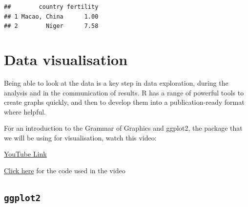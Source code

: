 \documentclass[
]{book}
\newenvironment{Shaded}{\begin{snugshade}}{\end{snugshade}}
\newcommand{\CommentTok}[1]{\textcolor[rgb]{0.56,0.35,0.01}{\textit{#1}}}
\newcommand{\KeywordTok}[1]{\textcolor[rgb]{0.13,0.29,0.53}{\textbf{#1}}}
\newcommand{\NormalTok}[1]{#1}
\newcommand{\OperatorTok}[1]{\textcolor[rgb]{0.81,0.36,0.00}{\textbf{#1}}}
\newcommand{\StringTok}[1]{\textcolor[rgb]{0.31,0.60,0.02}{#1}}
\begin{document}
\begin{Shaded}
\end{Shaded}

\begin{verbatim}
##        country fertility
## 1 Macao, China      1.00
## 2        Niger      7.58
\end{verbatim}

\hypertarget{data-visualisation}{%
\chapter{Data visualisation}\label{data-visualisation}}

Being able to look at the data is a key step in data exploration, during the analysis and in the communication of results. R has a range of powerful tools to create graphs quickly, and then to develop them into a publication-ready format where helpful.

For an introduction to the Grammar of Graphics and ggplot2, the package that we will be using for visualisation, watch this video:

\textcolor{blue}{\href{https://www.youtube.com/embed/sk7TT5qM5Hw?rel=0&modestbranding=1&loop=1&playlist=sk7TT5qM5Hw}{YouTube Link}}

\href{https://drive.google.com/open?id=1UGp7own42PkPv-TLbX29sQUu2DfeaMUp}{Click here} for the code used in the video

\hypertarget{ggplot2}{%
\section{\texorpdfstring{\texttt{ggplot2}}{ggplot2}}\label{ggplot2}}
\end{document}

